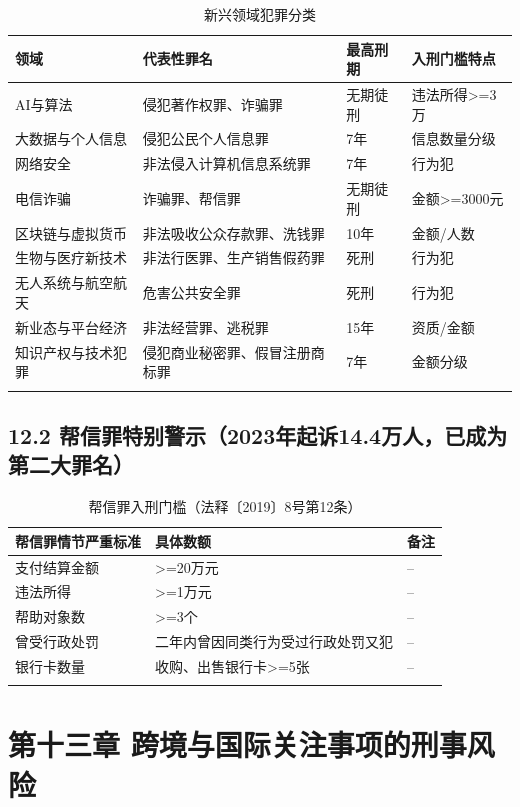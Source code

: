 \documentclass[12pt,a4paper]{article}
\begin{document}
\begin{longtable}{p{3cm}p{4cm}p{2cm}p{3cm}}
  \toprule
  \textbf{领域} & \textbf{代表性罪名} & \textbf{最高刑期} & \textbf{入刑门槛特点} \\
  \midrule
  AI与算法 & 侵犯著作权罪、诈骗罪 & 无期徒刑 & 违法所得>=3万 \\
  大数据与个人信息 & 侵犯公民个人信息罪 & 7年 & 信息数量分级 \\
  网络安全 & 非法侵入计算机信息系统罪 & 7年 & 行为犯 \\
  电信诈骗 & 诈骗罪、帮信罪 & 无期徒刑 & 金额>=3000元 \\
  区块链与虚拟货币 & 非法吸收公众存款罪、洗钱罪 & 10年 & 金额/人数 \\
  生物与医疗新技术 & 非法行医罪、生产销售假药罪 & 死刑 & 行为犯 \\
  无人系统与航空航天 & 危害公共安全罪 & 死刑 & 行为犯 \\
  新业态与平台经济 & 非法经营罪、逃税罪 & 15年 & 资质/金额 \\
  知识产权与技术犯罪 & 侵犯商业秘密罪、假冒注册商标罪 & 7年 & 金额分级 \\
  \bottomrule
  \caption{新兴领域犯罪分类}
\end{longtable}

\subsection{12.2 帮信罪特别警示（2023年起诉14.4万人，已成为第二大罪名）}

\begin{longtable}{p{5cm}p{4cm}p{3cm}}
  \toprule
  \textbf{帮信罪情节严重标准} & \textbf{具体数额} & \textbf{备注} \\
  \midrule
  支付结算金额 & >=20万元 & -- \\
  违法所得 & >=1万元 & -- \\
  帮助对象数 & >=3个 & -- \\
  曾受行政处罚 & 二年内曾因同类行为受过行政处罚又犯 & -- \\
  银行卡数量 & 收购、出售银行卡>=5张 & -- \\
  \bottomrule
  \caption{帮信罪入刑门槛（法释〔2019〕8号第12条）}
\end{longtable}

\clearpage

\section{第十三章 跨境与国际关注事项的刑事风险}
\end{document}
